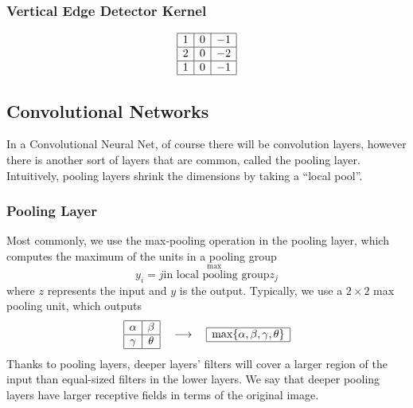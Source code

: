 \documentclass[11pt]{article}
\begin{document}
\subsubsection{Vertical Edge Detector Kernel}
    \begin{equation}
        \begin{array}{|c|c|c|}
        \hline 1 & {0} & {-1} \\
        \hline 2 & {0} & {-2} \\
        \hline 1 & {0} & {-1} \\
        \hline
    \end{array}
\end{equation}

\subsection{Convolutional Networks}
In a Convolutional Neural Net, of course there will be convolution layers, however there is another sort of layers that are common, called the pooling layer. Intuitively, pooling layers shrink the dimensions by taking a ``local pool''.
\subsubsection{Pooling Layer}
Most commonly, we use the max-pooling operation in the pooling layer, which computes the maximum of the units in a pooling group
\begin{equation}
    y_i = \overset{\max}{j \text{in local pooling group}}z_j
\end{equation}
where $z$ represents the input and $y$ is the output. Typically, we use a $2\times 2$ max pooling unit, which outputs
\begin{equation}
    \begin{array}{|c|c|}
        \hline
        \alpha & \beta \\
        \hline
        \gamma & \theta \\
        \hline
    \end{array} 
    \quad \longrightarrow
    \quad
    \begin{array}{|c|}
        \hline
            \max\{\alpha, \beta, \gamma, \theta\} \\
        \hline
    \end{array}
\end{equation}
Thanks to pooling layers, deeper layers' filters will cover a larger region of the input than equal-sized filters in the lower layers. We say that deeper pooling layers have larger receptive fields in terms of the original image. 
\end{document}
